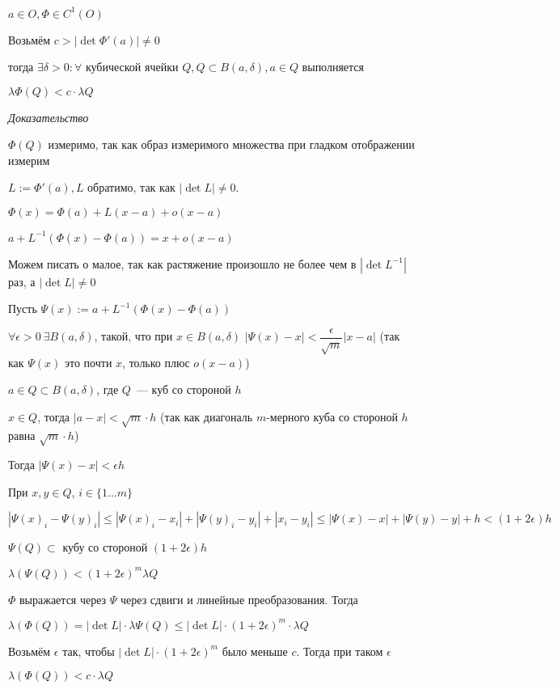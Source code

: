 \documentclass[paper=a4, fontsize=14pt]{report}
\begin{document}
$a \in O, \Phi \in C^1(O)$

Возьмём $c > |\det \Phi'(a)| \neq 0$

тогда $\exists \delta > 0: \forall$ кубической ячейки $Q, Q \subset B(a, \delta), a \in Q$ выполняется

$\lambda \Phi(Q) < c \cdot \lambda Q$


\emph{Доказательство}

$\Phi(Q)$ измеримо, так как образ измеримого множества при гладком отображении измерим

$L := \Phi'(a), L$ обратимо, так как $|\det L| \neq 0$.

$\Phi(x) = \Phi(a) + L(x - a) + o(x - a)$

$a + L^{-1} (\Phi(x) - \Phi(a)) = x + o(x - a)$

Можем писать о малое, так как растяжение произошло не более чем в $|\det L^{-1}|$ раз, а $|\det L| \neq 0$

Пусть $\Psi(x) := a + L^{-1} (\Phi(x) - \Phi(a))$

$\forall \epsilon > 0\ \exists B(a, \delta)$, такой, что при $x \in B(a, \delta)$ $|\Psi(x) - x| < \dfrac{\epsilon}{\sqrt{m}} |x - a|$ (так как $\Psi(x)$ это почти $x$, только плюс $o(x - a)$)

$a \in Q \subset B(a, \delta)$, где $Q$~--- куб со стороной $h$

$x \in Q$, тогда $|a - x| < \sqrt{m} \cdot h$ (так как диагональ $m$-мерного куба со стороной $h$ равна $\sqrt{m} \cdot h$)

Тогда $|\Psi(x) - x| < \epsilon h$

При $x, y \in Q$, $i \in \{1...m\}$

$|\Psi(x)_i - \Psi(y)_i| \leqslant |\Psi(x)_i - x_i| + |\Psi(y)_i - y_i| + |x_i - y_i| \leqslant |\Psi(x) - x| + |\Psi(y) - y| + h < (1 + 2 \epsilon)h$

$\Psi(Q) \subset$ кубу со стороной $(1 + 2 \epsilon) h$

$\lambda(\Psi(Q)) < (1 + 2 \epsilon)^m \lambda Q$

$\Phi$ выражается через $\Psi$ через сдвиги и линейные преобразования. Тогда

$\lambda(\Phi(Q)) = |\det L| \cdot \lambda \Psi(Q) \leqslant |\det L| \cdot (1 + 2 \epsilon)^m \cdot \lambda Q$

Возьмём $\epsilon$ так, чтобы $|\det L| \cdot (1 + 2 \epsilon)^m$ было меньше $c$. Тогда при таком $\epsilon$

$\lambda(\Phi(Q)) < c \cdot \lambda Q$
\end{document}

